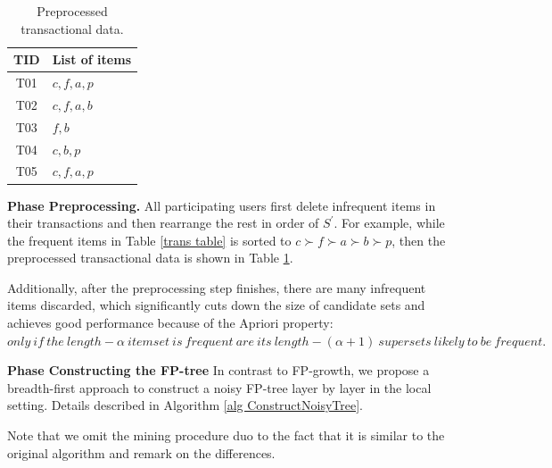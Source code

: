 \documentclass[conference]{IEEEtran}
\begin{document}

\begin{table}[tb]
\caption{{\color{red}Preprocessed transactional data.}}
\label{preprocessed trans}
\centering
\begin{tabular}{|c|l|}\hline
  TID&List of items \\\hline
  T01&$c,f,a,p$ \\\hline
  T02&$c,f,a,b$ \\\hline
  T03&$f,b$ \\\hline
  T04&$c,b,p$ \\\hline
  T05&$c,f,a,p$ \\\hline
\end{tabular}
\end{table}

\textbf{Phase \uppercase\expandafter{} Preprocessing.} All participating users first delete infrequent items in their transactions and then rearrange the rest in order of $S^{\prime}$. For example, while the frequent items in Table \ref{trans table} is sorted to $c\succ f\succ a\succ b\succ p$, then the preprocessed transactional data is shown in Table \ref{preprocessed trans}.

Additionally, after the preprocessing step finishes, there are many infrequent items discarded, which significantly cuts down the size of candidate sets and achieves good performance because of the Apriori property\cite{apr}: {\color{red} $only\ if\ the\ length-\alpha\ itemset\ is\ frequent\ are\ its\ length-(\alpha +1)\ supersets\ likely\ to\ be\ frequent.$}

\textbf{Phase \uppercase\expandafter{} Constructing the FP-tree} In contrast to FP-growth, we propose a breadth-first approach to construct a noisy FP-tree layer by layer in the local setting. Details described in Algorithm \ref{alg ConstructNoisyTree}. 

Note that we omit the mining procedure duo to the fact that it is similar to the original algorithm and remark on the differences.
\end{document}

